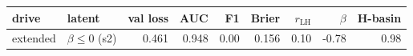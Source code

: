\begin{tabular}{llrrrrrrr}
\toprule
drive & latent & val loss & AUC & F1 & Brier & $r_{\mathrm{LH}}$ & $\beta$ & H-basin \\
\midrule
extended & $\beta\leq 0$ (s2) & 0.461 & 0.948 & 0.00 & 0.156 & 0.10 & -0.78 & 0.98 \\
\bottomrule
\end{tabular}